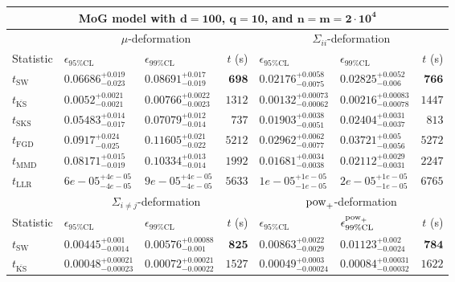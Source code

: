 \begin{tabular}{l|llr|llr}
	\toprule
	\multicolumn{7}{c}{{\bf MoG model with $\mathbf{d=100}$, $\mathbf{q=10}$, and $\mathbf{n=m=2\cdot 10^{4}}$}} \\
	\toprule
	\multicolumn{1}{c}{} & \multicolumn{3}{c}{$\mu$-deformation} & \multicolumn{3}{c}{$\Sigma_{ii}$-deformation} \\
	Statistic & $\epsilon_{95\%\mathrm{CL}}$ & $\epsilon_{99\%\mathrm    {CL}}$ & $t$ (s) & $\epsilon_{95\%\mathrm{CL}}$ & $\epsilon_{99\%\mathrm{CL}}$ & $t$ (s) \\
	\midrule
	$t_{\mathrm{SW}}$ & $0.06686_{-0.023}^{+0.019}$ & $0.08691_{-0.019}^{+0.017}$ & ${\mathbf{698}}$ & $0.02176_{-0.0075}^{+0.0058}$ & $0.02825_{-0.006}^{+0.0052}$ & ${\mathbf{766}}$ \\
	$t_{\overline{\mathrm{KS}}}$ & ${\mathbf{0.0052_{-0.0021}^{+0.0021}}}$ & ${\mathbf{0.00766_{-0.0023}^{+0.0022}}}$ & $1312$ & ${\mathbf{0.00132_{-0.00062}^{+0.00073}}}$ & ${\mathbf{0.00216_{-0.00078}^{+0.00083}}}$ & $1447$ \\
	$t_{\mathrm{SKS}}$ & $0.05483_{-0.017}^{+0.014}$ & $0.07079_{-0.014}^{+0.012}$ & $737$ & $0.01903_{-0.0051}^{+0.0038}$ & $0.02404_{-0.0037}^{+0.0031}$ & $813$ \\
	$t_{\mathrm{FGD}}$ & $0.0917_{-0.025}^{+0.024}$ & $0.11605_{-0.022}^{+0.021}$ & $5212$ & $0.02962_{-0.0077}^{+0.0062}$ & $0.03721_{-0.0056}^{+0.005}$ & $5272$ \\
	$t_{\mathrm{MMD}}$ & $0.08171_{-0.019}^{+0.015}$ & $0.10334_{-0.014}^{+0.013}$ & $1992$ & $0.01681_{-0.0038}^{+0.0034}$ & $0.02112_{-0.0031}^{+0.0029}$ & $2247$ \\
	$t_{\mathrm{LLR}}$ & $6e-05_{-4e-05}^{+4e-05}$ & $9e-05_{-4e-05}^{+4e-05}$ & $5633$ & $1e-05_{-1e-05}^{+1e-05}$ & $2e-05_{-1e-05}^{+1e-05}$ & $6765$ \\
	\toprule
	\multicolumn{1}{c}{} & \multicolumn{3}{c}{$\Sigma_{i\neq j}$-deformation} & \multicolumn{3}{c}{$\rm{pow}_{+}$-deformation} \\
	Statistic & $\epsilon_{95\%\mathrm{CL}}$ & $\epsilon_{99\%\mathrm{CL}}$ & $t$ (s) & $\epsilon_{95\%\mathrm{CL}}$ & $\epsilon^{\rm   {pow}_{+}}_{99\%\mathrm{CL}}$ & $t$ (s) \\
	\midrule
	$t_{\mathrm{SW}}$ & $0.00445_{-0.0014}^{+0.001}$ & $0.00576_{-0.001}^{+0.00088}$ & ${\mathbf{825}}$ & $0.00863_{-0.0029}^{+0.0022}$ & $0.01123_{-0.0024}^{+0.002}$ & ${\mathbf{784}}$ \\
	$t_{\overline{\mathrm{KS}}}$ & ${\mathbf{0.00048_{-0.00023}^{+0.00021}}}$ & ${\mathbf{0.00072_{-0.00022}^{+0.00021}}}$ & $1527$ & ${\mathbf{0.00049_{-0.00024}^{+0.0003}}}$ & ${\mathbf{0.00084_{-0.00032}^{+0.00031}}}$ & $1622$ \\

\end{tabular}
